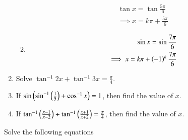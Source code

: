 \begin{enumerate}[label=\thesubsection.\arabic*,ref=\thesubsection.\theenumi]
\begin{enumerate}
\begin{align}
\tan x=\tan \frac{5\pi}{6}
\\
\implies
x = k\pi + \frac{5\pi}{6}
\end{align}
\item 
\begin{align}
\sin x=\sin \frac{7\pi}{6}
\\
	\implies x = k\pi + \left(-1\right)^k\frac{7\pi}{6}
\end{align}
\end{enumerate}
\item 	Solve $\tan^{-1}2x +\tan^{-1}3x=\frac{\pi}{4}$.
	\item If 
		$\sin\left(\sin^{-1}\left(\frac{1}{5}\right) + \cos^{-1}x\right)=1$, then find the value of $x$.
	\item If 
		$\tan^{-1}\left(\frac{x-1}{x-2}\right) +\tan^{-1}\left(\frac{x+1}{x+2}\right)=\frac{\pi}{4}$, then find the value of $x$.
\end{enumerate}
Solve the following equations
